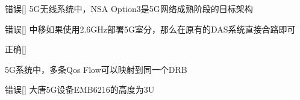 \begin{choice}{\;错误\;}[]
    5G无线系统中，NSA Option3是5G网络成熟阶段的目标架构

\end{choice}

\begin{choice}{\;错误\;}[]
    中移如果使用2.6GHz部署5G室分，那么在原有的DAS系统直接合路即可

\end{choice}

\begin{choice}{\;正确\;}[]

    5G系统中，多条Qos Flow可以映射到同一个DRB
\end{choice}


\begin{choice}{\;错误\;}[]
    大唐5G设备EMB6216的高度为3U

\end{choice}











